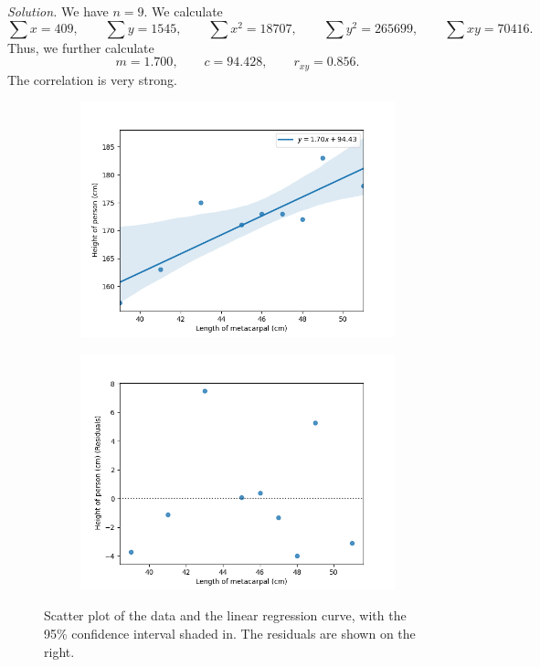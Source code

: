 \documentclass[10pt]{article}
\begin{document}
        \textit{Solution.} 
        We have $n = 9$. We calculate 
        \[
                \sum x = 409, \qquad \sum y = 1545, \qquad \sum x^2 = 18707, \qquad \sum y^2 = 265699, \qquad \sum xy = 70416.
        \]
        Thus, we further calculate
        \[
                m = 1.700, \qquad c = 94.428, \qquad r_{xy} = 0.856.
        \]
        The correlation is very strong.
        \begin{figure}[H]
        \centering
        \begin{subfigure}[b]{0.49\textwidth}
                \includegraphics[width=\textwidth]{./10_1_1.png}
        \end{subfigure}
        \begin{subfigure}[b]{0.49\textwidth}
                \includegraphics[width=\textwidth]{./10_1_2.png}
        \end{subfigure}
        \caption{Scatter plot of the data and the linear regression curve, with the 95\% confidence interval shaded in.
        The residuals are shown on the right.}
        \label{fig:metacarpal}
        \end{figure}
\end{document}
